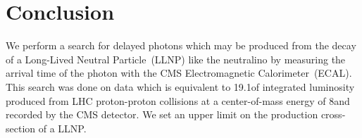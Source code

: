 \chapter{Conclusion}
\label{conclusion_chapter}
We perform a search for delayed photons which may be produced from the decay of a Long-Lived Neutral Particle~(LLNP) like the neutralino by measuring the arrival time of the photon with the CMS Electromagnetic Calorimeter~(ECAL). This search was done on data which is equivalent to 19.1\fbinv of integrated luminosity produced from LHC proton-proton collisions at a center-of-mass energy of $8$\TeV and recorded by the CMS detector. We set an upper limit on the production cross-section of a LLNP. 


\begin{comment}
\newline
Our exclusion limits on the lifetime, mass of lightest neutralino or effective SUSY breaking scale and the production cross section times branching ratio are the strongest limits using timing measurements alone to search for events with delayed photon. This is the first time that the CMS ECAL timing has been used as the only search quantity to search for LLNPs and the results demonstrate that CMS ECAL timing has good sensitivity and provides a reference for measuring future improvement on the sensitivity from additional search quantities, particularly in search experiments which use a combination different search quantities. 
\end{comment}
